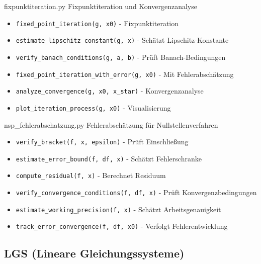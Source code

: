 \begin{KR}{fixpunktiteration.py}
    Fixpunktiteration und Konvergenzanalyse
    \begin{itemize}
        \item \texttt{fixed\_point\_iteration(g, x0)} - Fixpunktiteration
        \item \texttt{estimate\_lipschitz\_constant(g, x)} - Schätzt Lipschitz-Konstante
        \item \texttt{verify\_banach\_conditions(g, a, b)} - Prüft Banach-Bedingungen
        \item \texttt{fixed\_point\_iteration\_with\_error(g, x0)} - Mit Fehlerabschätzung
        \item \texttt{analyze\_convergence(g, x0, x\_star)} - Konvergenzanalyse
        \item \texttt{plot\_iteration\_process(g, x0)} - Visualisierung
    \end{itemize}
\end{KR}

\begin{KR}{nsp\_fehlerabschatzung.py}
    Fehlerabschätzung für Nullstellenverfahren
    \begin{itemize}
        \item \texttt{verify\_bracket(f, x, epsilon)} - Prüft Einschließung
        \item \texttt{estimate\_error\_bound(f, df, x)} - Schätzt Fehlerschranke
        \item \texttt{compute\_residual(f, x)} - Berechnet Residuum
        \item \texttt{verify\_convergence\_conditions(f, df, x)} - Prüft Konvergenzbedingungen
        \item \texttt{estimate\_working\_precision(f, x)} - Schätzt Arbeitsgenauigkeit
        \item \texttt{track\_error\_convergence(f, df, x0)} - Verfolgt Fehlerentwicklung
    \end{itemize}
\end{KR}

\subsection{LGS (Lineare Gleichungssysteme)}

